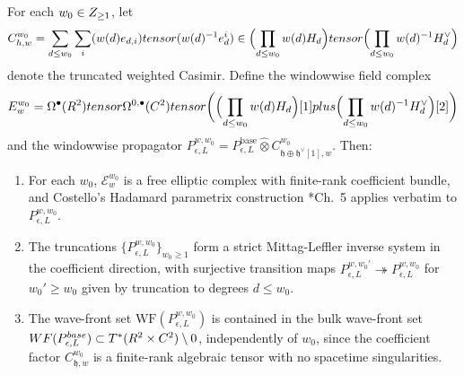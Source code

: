 \begin{lem}\label{lem:windowwise-parametrix}
  For each $w_0\in\Z_{\geq1}$, let
  \[
    C_{\mathfrak h,w}^{w_0}
      =
    \sum_{d\leq w_0}\sum_i
      (w(d)e_{d,i})\otimes(w(d)^{-1}e^i_d)
      \in
    \Bigl(\prod_{d\leq w_0}w(d)H_d\Bigr)
      \otimes
    \Bigl(\prod_{d\leq w_0}w(d)^{-1}H_d^\vee\Bigr)
  \]
  denote the truncated weighted Casimir. Define the windowwise field complex
  \begin{equation}\label{eq:windowwise-field-complex}
    \mathcal E_w^{w_0}=\Omega^\bullet(\R^2)\widehat\otimes
      \Omega^{0,\bullet}(\C^2)\widehat\otimes
      \biggl(\Bigl(\prod_{d\leq w_0}w(d)H_d\Bigr)[1]
      \oplus\Bigl(\prod_{d\leq w_0}w(d)^{-1}H_d^\vee\Bigr)[2]\biggr)
  \end{equation}
  and the windowwise propagator
  $P_{\epsilon,L}^{w,w_0}=P_{\epsilon,L}^{\mathrm{base}}\widehat\otimes
  C_{\mathfrak h\oplus\mathfrak h^\vee[1],w}^{w_0}$. Then:
  \begin{enumerate}[label=(\arabic*)]
    \item For each $w_0$, $\mathcal E_w^{w_0}$ is a free elliptic
      complex with finite-rank coefficient bundle, and Costello's
      Hadamard parametrix construction
      \cite{costello-renormalization}*{Ch.~5} applies verbatim to
      $P_{\epsilon,L}^{w,w_0}$.
    \item The truncations $\{P_{\epsilon,L}^{w,w_0}\}_{w_0\geq1}$
      form a strict Mittag-Leffler inverse system in the coefficient
      direction, with surjective transition maps
      $P_{\epsilon,L}^{w,w_0'}\twoheadrightarrow P_{\epsilon,L}^{w,w_0}$
      for $w_0'\geq w_0$ given by truncation to degrees
      $d\leq w_0$.
    \item The wave-front set
      $\mathrm{WF}(P_{\epsilon,L}^{w,w_0})$ is contained in the
      bulk wave-front set $\mathrm{WF}(P_{\epsilon,L}^{\mathrm{base}})
      \subset T^*(\R^2\times\C^2)\setminus 0$, independently of
      $w_0$, since the coefficient factor
      $C_{\mathfrak h,w}^{w_0}$ is a finite-rank algebraic tensor
      with no spacetime singularities.
  \end{enumerate}
\end{lem}


